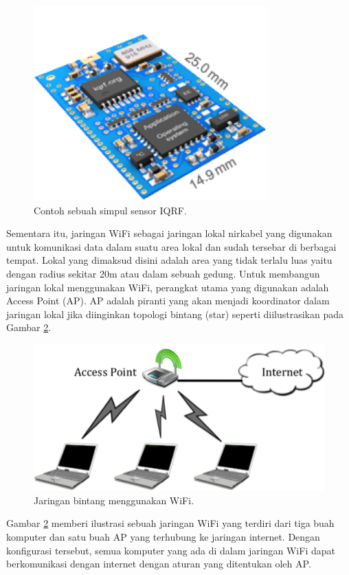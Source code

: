       \begin{figure}[ht!]
        \centering
          \includegraphics{gambar/iqrf}
          \caption{Contoh sebuah simpul sensor IQRF.}
          \label{iqrf}
      \end{figure}

    Sementara itu, jaringan WiFi sebagai jaringan lokal nirkabel yang digunakan untuk komunikasi data dalam suatu area lokal dan sudah tersebar di berbagai tempat. Lokal yang dimaksud disini adalah area yang tidak terlalu luas yaitu dengan radius sekitar 20m atau dalam sebuah gedung. Untuk membangun jaringan lokal menggunakan WiFi, perangkat utama yang digunakan adalah Access Point (AP). AP adalah piranti yang akan menjadi koordinator dalam jaringan lokal jika diinginkan topologi bintang (star) seperti diilustrasikan pada Gambar \ref{star}.

      \begin{figure}[ht!]
        \centering
          \includegraphics{gambar/star}
          \caption{Jaringan bintang menggunakan WiFi.}
          \label{star}
      \end{figure}

    Gambar \ref{star} memberi ilustrasi sebuah jaringan WiFi yang terdiri dari tiga buah komputer dan satu buah AP yang terhubung ke jaringan internet. Dengan konfigurasi tersebut, semua komputer yang ada di dalam jaringan WiFi dapat berkomunikasi dengan internet dengan aturan yang ditentukan oleh AP.

